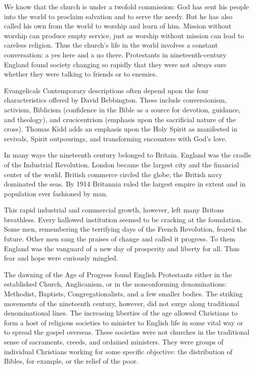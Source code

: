 We know that the church is under a twofold commission: God has sent his people into the world to
proclaim salvation and to serve the needy. But he has also called his own from the world to worship
and learn of him. Mission without worship can produce empty service, just as worship without mission
can lead to careless religion. Thus the church’s life in the world involves a constant conversation:
a yes here and a no there. Protestants in nineteenth-century England found society changing so
rapidly that they were not always sure whether they were talking to friends or to enemies.

\begin{sidebar}{Evangelicals}
Contemporary descriptions often depend upon the four characteristics offered by David Bebbington.
These include conversionism, activism, Biblicism (confidence in the Bible as a source for devotion,
guidance, and theology), and crucicentrism (emphasis upon the sacrificial nature of the cross).
Thomas Kidd adds an emphasis upon the Holy Spirit as manifested in revivals, Spirit outpourings, and
transforming encounters with God’s love.
\end{sidebar}

In many ways the nineteenth century belonged to Britain. England was the cradle of the Industrial
Revolution. London became the largest city and the financial center of the world. British commerce
circled the globe; the British navy dominated the seas. By 1914 Britannia ruled the largest empire
in extent and in population ever fashioned by man.

This rapid industrial and commercial growth, however, left many Britons breathless. Every hallowed
institution seemed to be cracking at the foundation. Some men, remembering the terrifying days of
the French Revolution, feared the future. Other men sang the praises of change and called it
progress. To them England was the vanguard of a new day of prosperity and liberty for all. Thus fear
and hope were curiously mingled.

The dawning of the Age of Progress found English Protestants either in the established Church,
Anglicanism, or in the nonconforming denominations: Methodist, Baptists, Congregationalists, and a
few smaller bodies. The striking movements of the nineteenth century, however, did not surge along
traditional denominational lines. The increasing liberties of the age allowed Christians to form a
host of religious societies to minister to English life in some vital way or to spread the gospel
overseas. These societies were not churches in the traditional sense of sacraments, creeds, and
ordained ministers. They were groups of individual Christians working for some specific objective:
the distribution of Bibles, for example, or the relief of the poor.

